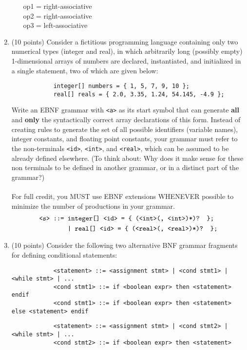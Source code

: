 \documentclass[10pt, letter]{article}
\begin{document}
\begin{enumerate}
\begin{itemize}
			\begin{center}
				op1 = right-associative \\
				op2 = right-associative \\
				op3 = left-associative
			\end{center}
		\end{itemize}
		\item (10 points) Consider a fictitious programming language containing only two numerical types (integer and real), in which arbitrarily long (possibly empty) 1-dimensional arrays of numbers are declared, instantiated, and initialized in a single statement, two of which are given below:
		\begin{verbatim}
			integer[] numbers = { 1, 5, 7, 9, 10 };
			real[] reals = { 2.0, 3.35, 1.24, 54.145, -4.9 };
		\end{verbatim}
		Write an EBNF grammar with {\tt <a>} as its start symbol that can generate {\bf all} and {\bf only} the syntactically correct array declarations of this form. Instead of creating rules to generate the set of all possible identifiers (variable names), integer constants, and floating point constants, your grammar must refer to the non-terminals {\tt <id>}, {\tt <int>}, and {\tt <real>}, which can be assumed to be already defined elsewhere. (To think about: Why does it make sense for these non terminals to be defined in another grammar, or in a distinct part of the grammar?) \\ \\
		For full credit, you MUST use EBNF extensions WHENEVER possible to minimize the number of productions in your grammar.
		\begin{align*}
			\text{\tt <s> ::= } &\text{\tt integer[] <id> = \{ (<int>(, <int>)*)? \};} \\
			&\text{\tt | real[] <id> = \{ (<real>(, <real>)*)? \};}
		\end{align*}
		\item (10 points) Consider the following two alternative BNF grammar fragments for defining conditional statements:
		\begin{verbatim}
			<statement> ::= <assignment stmt> | <cond stmt1> | <while stmt> | ...
			<cond stmt1> ::= if <boolean expr> then <statement> endif
			<cond stmt1> ::= if <boolean expr> then <statement> else <statement> endif
		\end{verbatim}
		\begin{verbatim}
			<statement> ::= <assignment stmt> | <cond stmt2> | <while stmt> | ...
			<cond stmt2> ::= if <boolean expr> then <statement>

\end{verbatim}
\end{enumerate}
\end{document}
